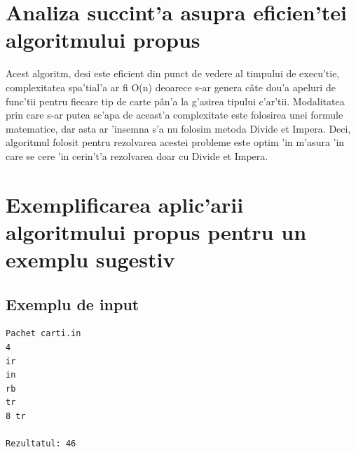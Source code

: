 \vspace{5mm}
\section{Analiza succint'a asupra eficien'tei algoritmului propus}
\myindent
Acest algoritm, desi este eficient din punct de vedere al timpului de execu'tie, complexitatea spa'tial'a ar fi O(n) deoarece s-ar genera c\^ate dou'a apeluri de func'tii pentru fiecare tip de carte p\^an'a la g'asirea tipului c'ar'tii. Modalitatea prin care s-ar putea sc'apa de aceast'a complexitate este folosirea unei formule matematice, dar asta ar 'insemna s'a nu folosim metoda Divide et Impera. Deci, algoritmul folosit pentru rezolvarea acestei probleme este optim 'in m'asura 'in care se cere 'in cerin't'a rezolvarea doar cu Divide et Impera.

\vspace{10mm}
\section{Exemplificarea aplic'arii algoritmului propus pentru un exemplu sugestiv}
\subsection{Exemplu de input}
\begin{verbatim}
Pachet carti.in
4
ir
in
rb
tr
8 tr

Rezultatul: 46
\end{verbatim}

